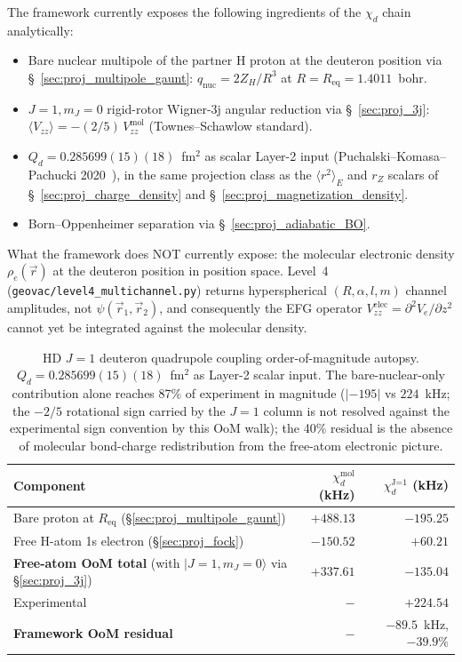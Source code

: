\documentclass[11pt]{article}
\begin{document}
The framework currently exposes the following ingredients of the
$\chi_d$ chain analytically:
\begin{itemize}\setlength\itemsep{0pt}
\item Bare nuclear multipole of the partner H proton at the
deuteron position via \S~\ref{sec:proj_multipole_gaunt}:
$q_\text{nuc} = 2 Z_H / R^3$ at $R = R_\text{eq} = 1.4011$~bohr.
\item $J=1, m_J=0$ rigid-rotor Wigner-3j angular reduction via
\S~\ref{sec:proj_3j}: $\langle V_{zz}\rangle = -(2/5)\,V_{zz}^\text{mol}$
(Townes--Schawlow standard).
\item $Q_d = 0.285699(15)(18)$~fm$^2$ as scalar Layer-2 input
(Puchalski--Komasa--Pachucki 2020~\cite{puchalski_komasa_pachucki2020}), in the same projection class as the
$\langle r^2\rangle_E$ and $r_Z$ scalars of \S~\ref{sec:proj_charge_density}
and \S~\ref{sec:proj_magnetization_density}.
\item Born--Oppenheimer separation via \S~\ref{sec:proj_adiabatic_BO}.
\end{itemize}
What the framework does NOT currently expose: the molecular
electronic density $\rho_e(\vec{r})$ at the deuteron position
in position space.  Level~4 (\texttt{geovac/level4\_multichannel.py})
returns hyperspherical $(R, \alpha, l, m)$ channel amplitudes,
not $\psi(\vec{r}_1, \vec{r}_2)$, and consequently the EFG
operator $V_{zz}^\text{elec} = \partial^2 V_e/\partial z^2$ cannot
yet be integrated against the molecular density.

\begin{table}[h]
\centering\small
\begin{tabular}{p{5.5cm} r r}
\toprule
Component & $\chi_d^\text{mol}$ (kHz) & $\chi_d^\text{J=1}$ (kHz) \\
\midrule
Bare proton at $R_\text{eq}$ (\S\ref{sec:proj_multipole_gaunt}) &
$+488.13$ & $-195.25$ \\
Free H-atom 1s electron (\S\ref{sec:proj_fock}) &
$-150.52$ & $+60.21$ \\
\midrule
\textbf{Free-atom OoM total} (with $|J=1, m_J=0\rangle$ via
\S\ref{sec:proj_3j}) & $+337.61$ & $\mathbf{-135.04}$ \\
\midrule
Experimental & $-$ & $+224.54$ \\
\textbf{Framework OoM residual} & $-$ &
$\mathbf{-89.5}$~kHz, $\mathbf{-39.9\%}$ \\
\bottomrule
\end{tabular}
\caption{HD $J=1$ deuteron quadrupole coupling order-of-magnitude
autopsy.  $Q_d = 0.285699(15)(18)$~fm$^2$ as Layer-2 scalar input.
The bare-nuclear-only contribution alone reaches 87\% of experiment
in magnitude ($|{-}195|$ vs $224$~kHz; the $-2/5$ rotational sign
carried by the $J{=}1$ column is not resolved against the experimental
sign convention by this OoM walk); the 40\% residual is the absence of molecular
bond-charge redistribution from the free-atom electronic picture.}
\label{tab:autopsy_HD_rotational_HFS}
\end{table}
\end{document}
